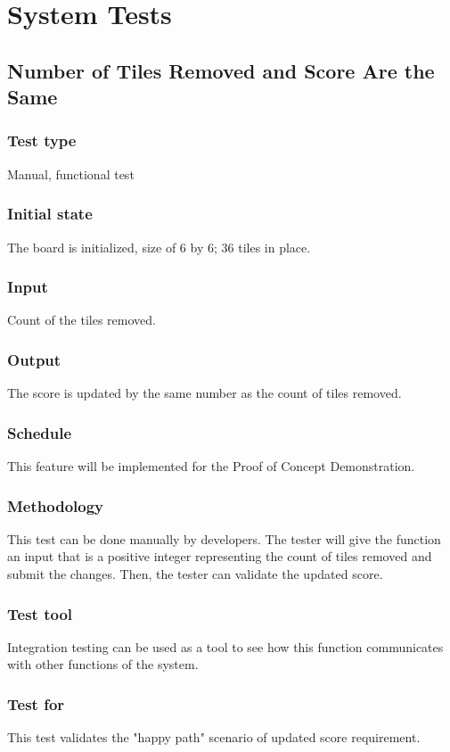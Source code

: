 \documentclass[12pt]{article}
\begin{document}
\newpage
%
%

\section{System Tests}
\subsection{Number of Tiles Removed and Score Are the Same}
\subsubsection{Test type}
Manual, functional test
\subsubsection{Initial state}
The board is initialized, size of 6 by 6; 36 tiles in place.
\subsubsection{Input}
Count of the tiles removed.
\subsubsection{Output}
The score is updated by the same number as the count of tiles removed.
\subsubsection{Schedule}
This feature will be implemented for the Proof of Concept Demonstration.
\subsubsection{Methodology}
This test can be done manually by developers. The tester will give the function an input that is a positive integer representing the count of tiles removed and submit the changes. Then, the tester can validate the updated score.
\subsubsection{Test tool}
Integration testing can be used as a tool to see how this function communicates with other functions of the system.
\subsubsection{Test for}
This test validates the "happy path" scenario of updated score requirement. 
\end{document}
